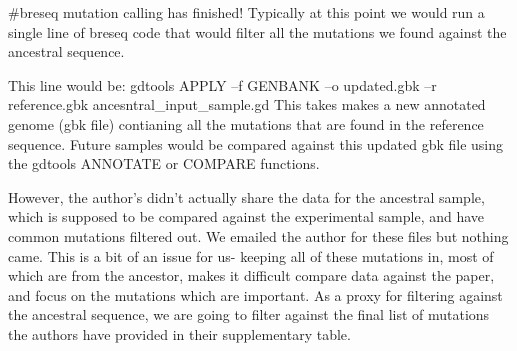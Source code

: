 \documentclass[
]{article}
\newenvironment{Shaded}{\begin{snugshade}}{\end{snugshade}}
\newcommand{\CommentTok}[1]{\textcolor[rgb]{0.56,0.35,0.01}{\textit{#1}}}
\begin{document}
\begin{Shaded}
\end{Shaded}

\#breseq mutation calling has finished! Typically at this point we would
run a single line of breseq code that would filter all the mutations we
found against the ancestral sequence.

This line would be: gdtools APPLY --f GENBANK --o updated.gbk --r
reference.gbk ancesntral\_input\_sample.gd This takes makes a new
annotated genome (gbk file) contianing all the mutations that are found
in the reference sequence. Future samples would be compared against this
updated gbk file using the gdtools ANNOTATE or COMPARE functions.

However, the author's didn't actually share the data for the ancestral
sample, which is supposed to be compared against the experimental
sample, and have common mutations filtered out. We emailed the author
for these files but nothing came. This is a bit of an issue for us-
keeping all of these mutations in, most of which are from the ancestor,
makes it difficult compare data against the paper, and focus on the
mutations which are important. As a proxy for filtering against the
ancestral sequence, we are going to filter against the final list of
mutations the authors have provided in their supplementary table.
\end{document}
